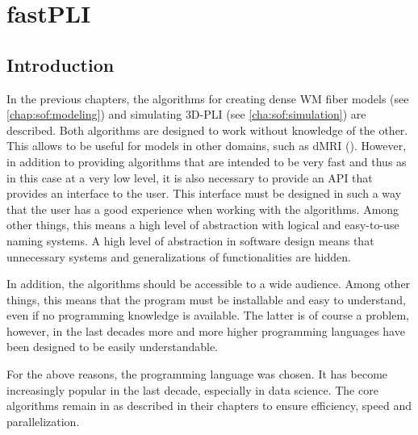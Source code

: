 \setcounter{chapter}{5}
\chapter{\acs{fastPLI}}
\label{chap:Software}
% 
% 
% 
% 
%  
\section{Introduction}
% 
In the previous chapters, the algorithms for creating dense \ac{WM} fiber models (see \cref{chap:sof:modeling}) and simulating \ac{3D-PLI} (see \cref{cha:sof:simulation}) are described.
Both algorithms are designed to work without knowledge of the other.
This allows \eg{} to be useful for models in other domains, such as \ac{dMRI} (\cite{Ginsburger2019,ginsburgerDis2019}).
However, in addition to providing algorithms that are intended to be very fast and thus as in this case at a very low level, it is also necessary to provide an \ac{API} that provides an interface to the user.
This interface must be designed in such a way that the user has a good experience when working with the algorithms.
Among other things, this means a high level of abstraction with logical and easy-to-use naming systems.
A high level of abstraction in software design means that unnecessary systems and generalizations of functionalities are hidden.
% 
\par
% 
In addition, the algorithms should be accessible to a wide audience.
Among other things, this means that the program must be installable and easy to understand, even if no programming knowledge is available.
The latter is of course a problem, however, in the last decades more and more higher programming languages have been designed to be easily understandable.
% 
\par
% 
For the above reasons, the \python{} programming language was chosen.
It has become increasingly popular in the last decade, especially in data science.
The core algorithms remain in \cpp{} as described in their chapters to ensure efficiency, speed and parallelization.
%
